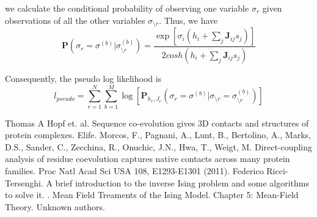 \documentclass[a4paper,12pt]{article}
\begin{document}
we calculate the conditional probability of observing one variable $ \sigma_r $ given observations of all the other variables $ \sigma_{\setminus r} $. Thus, we have
\begin{equation}\label{eq8}
\mathbf{P} \left( \sigma_r=\sigma^{(b)} | \sigma_{\setminus r}^{(b)} \right) = \frac{\exp [\sigma_i(h_i+ \sum_j \mathbf{J}_{ij}s_j)]}{2cosh \left( h_i+\sum_j \mathbf{J}_{ij}s_j \right)}
\end{equation}

Consequently, the pseudo log likelihood is
\begin{equation}\label{eq9}
l_{pseudo} = \sum_{r=1}^N \sum_{b=1}^M \log \left[ \mathbf{P}_{h_r,J_r} \left( \sigma_r=\sigma^{(b)} | \sigma_{\setminus r}=\sigma_{\setminus r}^{(b)} \right) \right]
\end{equation}


\begin{thebibliography}{1}

   Thomas A Hopf et. al. Sequence co-evolution gives 3D contacts and structures of protein complexes. Elife.
 Morcos, F., Pagnani, A., Lunt, B., Bertolino, A., Marks, D.S., Sander, C., Zecchina, R., Onuchic, J.N., Hwa, T., Weigt, M. Direct-coupling analysis of residue coevolution captures native contacts across many protein families. Proc Natl Acad Sci USA 108, E1293-E1301 (2011).
 Federico Ricci-Tersenghi. A brief introduction to the inverse Ising problem and some algorithms to solve it.
. Mean Field Treaments  of the Ising Model. Chapter 5: Mean-Field Theory. Unknown authors.

  \end{thebibliography}
\end{document}
